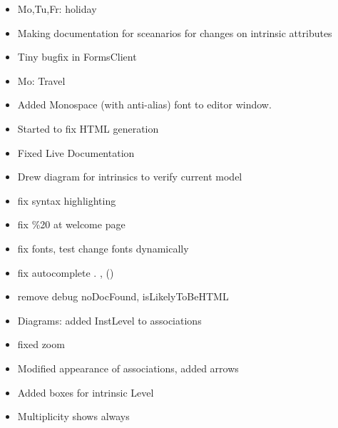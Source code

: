 \begin{itemize} 
\item Mo,Tu,Fr: holiday
\item Making documentation for sceanarios for changes on intrinsic attributes
\item Tiny bugfix in FormsClient
\end{itemize}

\begin{itemize} 
\item Mo: Travel
\item Added Monospace (with anti-alias) font to editor window.
\end{itemize}

\begin{itemize} 
\item Started to fix HTML generation
\end{itemize}

\begin{itemize} 
\item Fixed Live Documentation
\item Drew diagram for intrinsics to verify current model
\end{itemize}

\begin{itemize} 
\item fix syntax highlighting
\item fix \%20 at welcome page
\end{itemize}

\begin{itemize} 
\item fix fonts, test change fonts dynamically
\item fix autocomplete . , ()
\item remove debug noDocFound, isLikelyToBeHTML
\end{itemize}

\begin{itemize} 
\item Diagrams: added InstLevel to associations
\item fixed zoom
\end{itemize}

\begin{itemize} 
\item Modified appearance of associations, added arrows
\item Added boxes for intrinsic Level
\item Multiplicity shows always
\end{itemize}

